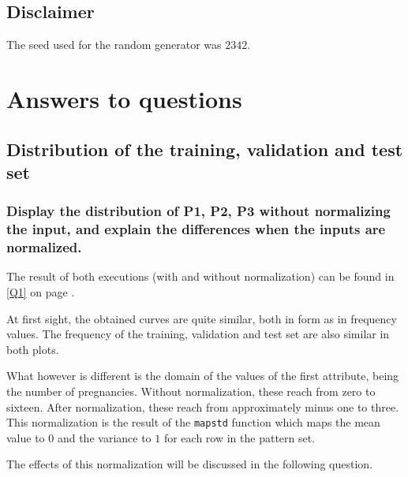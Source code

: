 \documentclass[12pt, a4paper]{article}
\begin{document}



\pagestyle{fancy}

\subsection*{Disclaimer}
The seed used for the random generator was $2342$.

\section*{Answers to questions}
\subsection*{Distribution of the training, validation and test set}
\subsubsection{Display the distribution of P1, P2, P3 without normalizing the input, and explain the differences when the inputs are normalized.}
The result of both executions (with and without normalization) can be found in \ref{Q1} on page \pageref{Q1}. 

At first sight, the obtained curves are quite similar, both in form as in frequency values. The frequency of the training, validation and test set are also similar in both plots.

What however is different is the domain of the values of the first attribute, being the number of pregnancies. Without normalization, these reach from zero to sixteen. After normalization, these reach from approximately minus one to three. This normalization is the result of the \texttt{mapstd} function which maps the mean value to $0$ and the variance to $1$ for each row in the pattern set. 

The effects of this normalization will be discussed in the following question.
\end{document}
